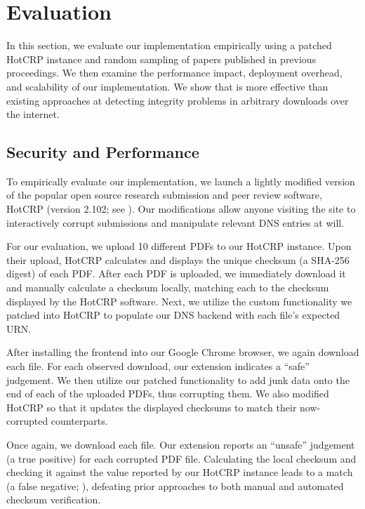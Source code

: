 \section{Evaluation} \label{sec:evaluation}

In this section, we evaluate our implementation empirically using a patched
HotCRP instance and random sampling of papers published in previous
\CONFERENCE{} proceedings. We then examine the performance impact, deployment
overhead, and scalability of our implementation. We show that \SYSTEM{} is more
effective than existing approaches at detecting integrity problems in arbitrary
downloads over the internet.

\subsection{Security and Performance}

To empirically evaluate our implementation, we launch a lightly modified version
of the popular open source research submission and peer review software, HotCRP
(version 2.102; see ). Our modifications allow anyone
visiting the site to interactively corrupt submissions and manipulate relevant
DNS entries at will.

For our evaluation, we upload 10 different \CONFERENCE{} PDFs to our HotCRP
instance. Upon their upload, HotCRP calculates and displays the unique checksum
(a SHA-256 digest) of each PDF. After each PDF is uploaded, we immediately
download it and manually calculate a checksum locally, matching each to the
checksum displayed by the HotCRP software. Next, we utilize the custom
functionality we patched into HotCRP to populate our DNS backend with each
file's expected URN.

After installing the frontend into our Google Chrome browser, we again download
each file. For each observed download, our extension indicates a ``safe''
judgement. We then utilize our patched functionality to add junk data onto the
end of each of the uploaded PDFs, thus corrupting them. We also modified HotCRP
so that it updates the displayed checksums to match their now-corrupted
counterparts.

Once again, we download each file. Our extension reports an ``unsafe''
judgement (a true positive) for each corrupted PDF file. Calculating the local
checksum and checking it against the value reported by our HotCRP instance leads
to a match (a false negative; ), defeating prior
approaches to both manual and automated checksum verification.

